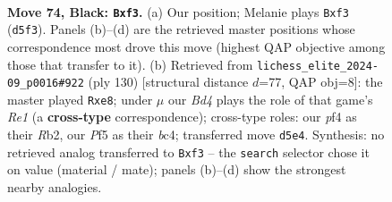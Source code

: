 \documentclass[11pt]{article}
\begin{document}
\begin{figure}[p]\centering
\begin{subfigure}{0.46\textwidth}\centering
\resizebox{\linewidth}{!}{%
\newchessgame
\chessboard[
  setfen={8/3k2B1/p2b2rr/Pppb1p1p/2p2P1P/4PNP1/1P3K2/2RR4 b - - 0 74},
  showmover=false,
  pgfstyle=straightmove, color=movearrow, markmove={d5-f3}
]}
\caption{}
\end{subfigure}\hfill
\begin{subfigure}{0.46\textwidth}\centering
\resizebox{\linewidth}{!}{%
\newchessgame
\chessboard[
  setfen={4r2r/2k5/1p1p4/n1p2B2/P1bp1pPp/2P2P1P/1R3BK1/4R3 w - - 0 66},
  showmover=false,
  pgfstyle=straightmove, color=movearrow, markmove={e1-e8}
]}
\caption{}
\end{subfigure}
\\[4pt]

\caption{\textbf{Move 74, Black: \texttt{Bxf3}.} (a) Our position; Melanie plays \texttt{Bxf3} (\texttt{d5f3}). Panels (b)--(d) are the retrieved master positions whose correspondence most drove this move (highest QAP objective among those that transfer to it). (b) Retrieved from \texttt{lichess\_elite\_2024-09\_p0016\#922} (ply 130) [structural distance $d$=77, QAP obj=8]: the master played \texttt{Rxe8}; under $\mu$ our \emph{Bd4} plays the role of that game's \emph{Re1} (a \textbf{cross-type} correspondence); cross-type roles: our \emph{p}f4 as their \emph{R}b2, our \emph{P}f5 as their \emph{b}c4; transferred move \texttt{d5e4}. Synthesis: no retrieved analog transferred to \texttt{Bxf3} -- the \texttt{search} selector chose it on value (material / mate); panels (b)--(d) show the strongest nearby analogies.}
\label{fig:thought-m147}
\end{figure}

\clearpage
\end{document}
